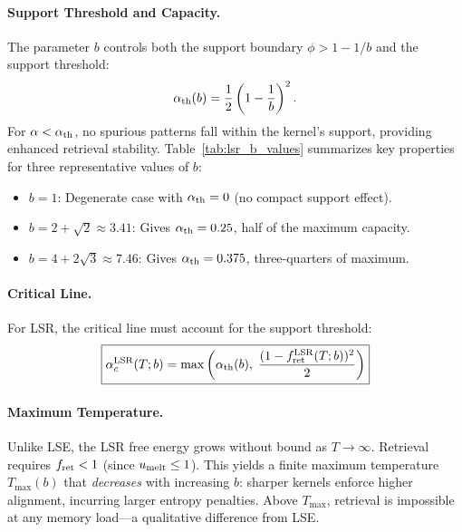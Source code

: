 \documentclass{article}
\theoremstyle{plain}
\theoremstyle{definition}
\theoremstyle{remark}
\begin{document}
\paragraph{Support Threshold and Capacity.} The parameter $b$ controls both the support boundary $\phi > 1 - 1/b$ and the support threshold:
\begin{equation}
    \alpha_{\rm th}(b) = \frac{1}{2}\left(1 - \frac{1}{b}\right)^2.
\end{equation}
For $\alpha < \alpha_{\rm th}$, no spurious patterns fall within the kernel's support, providing enhanced retrieval stability. Table~\ref{tab:lsr_b_values} summarizes key properties for three representative values of $b$:
\begin{itemize}
    \item $b = 1$: Degenerate case with $\alpha_{\rm th} = 0$ (no compact support effect).
    \item $b = 2 + \sqrt{2} \approx 3.41$: Gives $\alpha_{\rm th} = 0.25$, half of the maximum capacity.
    \item $b = 4 + 2\sqrt{3} \approx 7.46$: Gives $\alpha_{\rm th} = 0.375$, three-quarters of maximum.
\end{itemize}

\paragraph{Critical Line.} For LSR, the critical line must account for the support threshold:
\begin{equation}
    \boxed{\alpha_c^{\rm LSR}(T; b) = \max\left(\alpha_{\rm th}(b),\; \frac{(1 - f_{\rm ret}^{\rm LSR}(T; b))^2}{2}\right)}
    \label{eq:alpha_lsr}
\end{equation}

\paragraph{Maximum Temperature.} Unlike LSE, the LSR free energy grows without bound as $T \to \infty$. Retrieval requires $f_{\rm ret} < 1$ (since $u_{\rm melt} \le 1$). This yields a finite maximum temperature $T_{\max}(b)$ that \emph{decreases} with increasing $b$: sharper kernels enforce higher alignment, incurring larger entropy penalties. Above $T_{\max}$, retrieval is impossible at any memory load---a qualitative difference from LSE.
\end{document}
